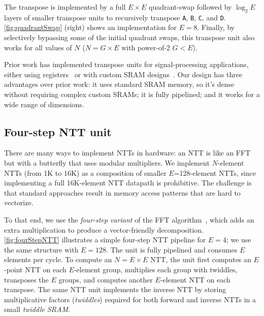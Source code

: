 The transpose is implemented by a full $E \times E$ quadrant-swap followed by $\log_2E$ layers of smaller transpose units
to recursively transpose \texttt{A}, \texttt{B}, \texttt{C}, and \texttt{D}. \autoref{fig:quadrantSwap} (right) shows an implementation for $E=8$. Finally, by selectively bypassing some of the initial quadrant swaps,
this transpose unit also works for all values of $N$ ($N=G\times E$ with power-of-2 $G < E$).

Prior work has implemented transpose units for signal-processing applications,
either using registers~\cite{wang2018pipelined,zhang2020novel} or with custom SRAM designs~\cite{shang2014single}.
Our design has three advantages over prior work: it uses standard SRAM memory,
so it's dense without requiring complex custom SRAMs;
it is fully pipelined; and it works for a wide range of dimensions.

\subsection{Four-step NTT unit}\label{sec:fourStepNTT}

\figFourStepNTT


There are many ways to implement NTTs in hardware:
an NTT is like an FFT~\cite{cooley:moc65:algorithm}
but with a butterfly that uses modular multipliers.
We implement $N$-element NTTs (from 1K to 16K) as a composition
of smaller $E$=128-element NTTs,
since implementing a full 16K-element NTT datapath is prohibitive.
The challenge is that standard approaches result in memory access patterns
that are hard to vectorize.

To that end, we use the \textit{four-step variant} of the FFT algorithm~\cite{bailey:supercomputing89:FFTs},
which adds an extra multiplication to produce a vector-friendly decomposition.
\autoref{fig:fourStepNTT} illustrates a simple four-step NTT pipeline for $E=4$;
we use the same structure with $E=128$.
The unit is fully pipelined and consumes $E$ elements per cycle.
To compute an $N=E\times E$ NTT, the unit first computes an $E$-point NTT on each $E$-element group,
multiplies each group with twiddles,
transposes the $E$ groups, and computes another $E$-element NTT on each transpose.
The same NTT unit implements the inverse NTT
by storing multiplicative factors (\textit{twiddles}) required for both forward and inverse NTTs in a small \textit{twiddle SRAM}.

